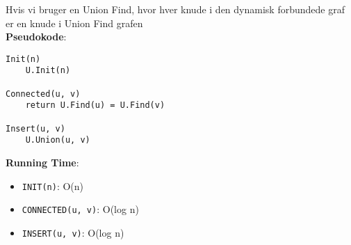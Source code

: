 Hvis vi bruger en Union Find, hvor hver knude i den dynamisk forbundede graf er en knude i Union Find grafen\\
\textbf{Pseudokode}:
\begin{lstlisting}[frame=single, mathescape=true]
Init(n)
	U.Init(n)

Connected(u, v)
	return U.Find(u) = U.Find(v)

Insert(u, v)
	U.Union(u, v)
\end{lstlisting}
\textbf{Running Time}:
\begin{itemize}
	\item \texttt{INIT(n)}: O(n)
	\item \texttt{CONNECTED(u, v)}: O(log n)
	\item \texttt{INSERT(u, v)}: O(log n) 
\end{itemize}